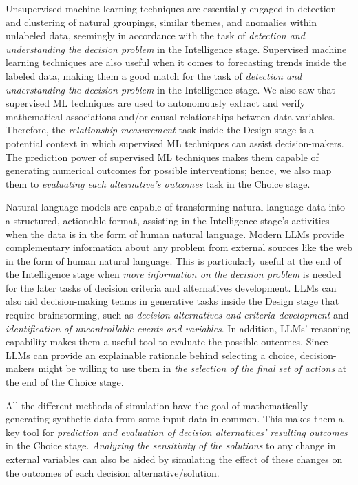\documentclass{sfuthesis}
\begin{document}
Unsupervised machine learning techniques are essentially engaged in detection and clustering of natural groupings, similar themes, and anomalies within unlabeled data, seemingly in accordance with the task of \textit{detection and understanding the decision problem} in the Intelligence stage. Supervised machine learning techniques are also useful when it comes to forecasting trends inside the labeled data, making them a good match for the task of \textit{detection and understanding the decision problem} in the Intelligence stage. We also saw that supervised ML techniques are used to autonomously extract and verify mathematical associations and/or causal relationships between data variables. Therefore, the \textit{relationship measurement} task inside the Design stage is a potential context in which supervised ML techniques can assist decision-makers. The prediction power of supervised ML techniques makes them capable of generating numerical outcomes for possible interventions; hence, we also map them to \textit{evaluating each alternative’s outcomes} task in the Choice stage.\par 
Natural language models are capable of transforming natural language data into a structured, actionable format, assisting in the Intelligence stage’s activities when the data is in the form of human natural language. Modern LLMs provide complementary information about any problem from external sources like the web in the form of human natural language. This is particularly useful at the end of the Intelligence stage when \textit{more information on the decision problem} is needed for the later tasks of decision criteria and alternatives development. LLMs can also aid decision-making teams in generative tasks inside the Design stage that require brainstorming, such as \textit{decision alternatives and criteria development} and \textit{identification of uncontrollable events and variables}. In addition, LLMs’ reasoning capability makes them a useful tool to evaluate the possible outcomes. Since LLMs can provide an explainable rationale behind selecting a choice, decision-makers might be willing to use them in \textit{the selection of the final set of actions} at the end of the Choice stage.\par
All the different methods of simulation have the goal of mathematically generating synthetic data from some input data in common. This makes them a key tool for \textit{prediction and evaluation of decision alternatives’ resulting outcomes} in the Choice stage. \textit{Analyzing the sensitivity of the solutions} to any change in external variables can also be aided by simulating the effect of these changes on the outcomes of each decision alternative/solution.\par 
\end{document}
